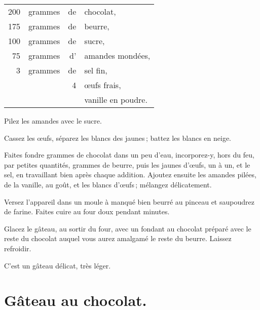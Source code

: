 \footnotesize
\begin{longtable}{rrrp{16em}}
    200 & grammes & de & chocolat,                                                                        \\
    175 & grammes & de & beurre,                                                                          \\
    100 & grammes & de & sucre,                                                                           \\
     75 & grammes & d' & amandes mondées,                                                                 \\
      3 & grammes & de & sel fin,                                                                         \\
        &         &  4 & œufs frais,                                                                      \\
        &         &    & vanille en poudre.                                                               \\
\end{longtable}
\normalsize

Pilez les amandes avec le sucre.

Cassez les œufs, séparez les blancs des jaunes ; battez les blancs en neige.

Faites fondre {\mmm} grammes de chocolat dans un peu d'eau, incorporez-y,
hors du feu, par petites quantités, {\mmm} grammes de beurre, puis les
jaunes d'œufs, un à un, et le sel, en travaillant bien après chaque addition.
Ajoutez ensuite les amandes pilées, de la vanille, au goût, et les blancs
d'œufs ; mélangez délicatement.

Versez l'appareil dans un moule à manqué bien beurré au pinceau et saupoudrez
de farine. Faites cuire au four doux pendant {\mmm} minutes.

Glacez le gâteau, au sortir du four, avec un fondant au chocolat préparé avec
le reste du chocolat auquel vous aurez amalgamé le reste du beurre. Laissez
refroidir.

C'est un gâteau délicat, très léger.

\section*{\centering Gâteau au chocolat.}
{}

